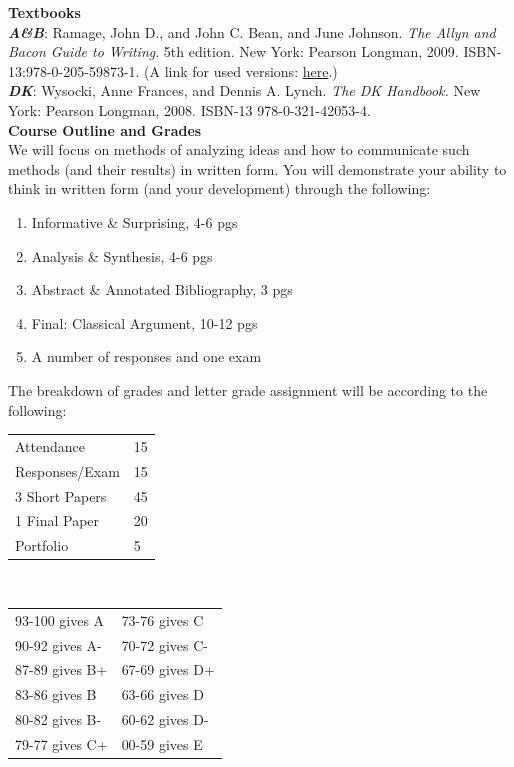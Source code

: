 \documentclass[11pt]{article}
\begin{document}
   {\bf Textbooks}\\
{\bf \textsl {A\&B}}: Ramage, John D., and John C. Bean, and June Johnson. {\sl The Allyn and Bacon Guide to 
Writing}. 5th edition. New York: Pearson Longman, 2009. ISBN-13:978-0-205-59873-1. 
(A link for used versions:  \href{http://www.amazon.com/Allyn-Bacon-Guide-Writing-MyCompLab/dp/0205598730/ref=sr
_1_3/175-1452668-8158623?ie=UTF8&s=books&qid=1245772101&sr=1-3}{here}.) \\
{\bf \textsl {DK}}: Wysocki, Anne Frances, and Dennis A. Lynch. {\sl The DK Handbook.} New York: Pearson Longman, 
2008. ISBN-13 978-0-321-42053-4. 
   \ \\

   {\bf Course Outline and Grades}\\
   We will focus on methods of analyzing ideas and how to communicate such methods (and their results) in written form. You will demonstrate your ability to think in written form (and your development) through the following:
   \begin{enumerate}
     \item Informative \& Surprising, 4-6 pgs
     \item Analysis \& Synthesis, 4-6 pgs
     \item Abstract \& Annotated Bibliography, 3 pgs
     \item Final: Classical Argument, 10-12 pgs
     \item A number of responses and one exam
   \end{enumerate}

The breakdown of grades and letter grade assignment will be according to the following:
\vskip 2mm
  
\begin{tabular}{|l|l|}
\hline
Attendance & 15\\
Responses/Exam & 15\\
3 Short Papers & 45\\
1 Final Paper & 20\\
Portfolio & 5\\
\hline
\end{tabular} \  \  \  \  \ \begin{tabular}{|l|l|}
   \hline
   93-100 gives A &  73-76 gives C\\
   90-92 gives A- & 70-72 gives C-\\
   87-89 gives B+ & 67-69 gives D+\\
   83-86 gives B & 63-66 gives D\\
   80-82 gives B- & 60-62 gives D-\\
   79-77 gives C+ & 00-59 gives E\\
   \hline 
   \end{tabular}
   \ \\
\newtheorem{comment}{Comment}

 
\end{document}
